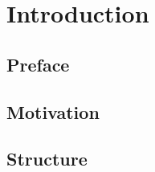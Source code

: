 \chapter{Introduction}\label{chapter:introduction}

\section{Preface}\label{sec:introduction:preface}

\section{Motivation}\label{sec:introduction:motivation}

\section{Structure}\label{sec:introduction:structure}